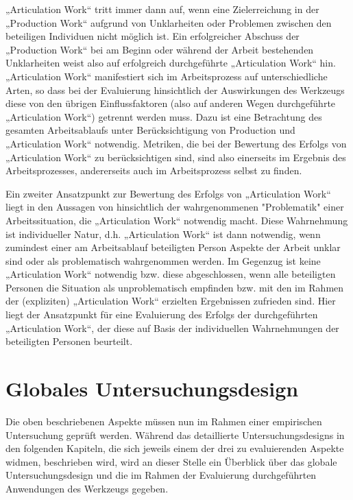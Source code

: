 „Articulation Work“ tritt immer dann auf, wenn eine Zielerreichung in der „Production Work“ aufgrund von Unklarheiten oder Problemen zwischen den beteiligen Individuen nicht möglich ist. Ein erfolgreicher Abschuss der „Production Work“ bei am Beginn oder während der Arbeit bestehenden Unklarheiten weist also auf erfolgreich durchgeführte „Articulation Work“ hin. „Articulation Work“ manifestiert sich im Arbeitsprozess auf unterschiedliche Arten, so dass bei der Evaluierung hinsichtlich der Auswirkungen des Werkzeugs diese von den übrigen Einflussfaktoren (also auf anderen Wegen durchgeführte „Articulation Work“) getrennt werden muss. Dazu ist eine Betrachtung des gesamten Arbeitsablaufs unter Berücksichtigung von Production und „Articulation Work“ notwendig. Metriken, die bei der Bewertung des Erfolgs von „Articulation Work“ zu berücksichtigen sind, sind also einerseits im Ergebnis des Arbeitsprozesses, andererseits auch im Arbeitsprozess selbst zu finden.

Ein zweiter Ansatzpunkt zur Bewertung des Erfolgs von „Articulation Work“ liegt in den Aussagen von \citet{Strauss93} hinsichtlich der wahrgenommenen "Problematik" einer Arbeitssituation, die „Articulation Work“ notwendig macht. Diese Wahrnehmung ist individueller Natur, d.h. „Articulation Work“ ist dann notwendig, wenn zumindest einer am Arbeitsablauf beteiligten Person Aspekte der Arbeit unklar sind oder als problematisch wahrgenommen werden. Im Gegenzug ist keine „Articulation Work“ notwendig bzw. diese abgeschlossen, wenn alle beteiligten Personen die Situation als unproblematisch empfinden bzw. mit den im Rahmen der (expliziten) „Articulation Work“ erzielten Ergebnissen zufrieden sind. Hier liegt der Ansatzpunkt für eine Evaluierung des Erfolgs der durchgeführten „Articulation Work“, der diese auf Basis der individuellen Wahrnehmungen der beteiligten Personen beurteilt.

\section{Globales Untersuchungsdesign}
\label{sec:globales_untersuchungsdesign}

Die oben beschriebenen Aspekte müssen nun im Rahmen einer empirischen Untersuchung geprüft werden. Während das detaillierte Untersuchungsdesigns in den folgenden Kapiteln, die sich jeweils einem der drei zu evaluierenden Aspekte widmen, beschrieben wird, wird an dieser Stelle ein Überblick über das globale Untersuchungsdesign und die im Rahmen der Evaluierung durchgeführten Anwendungen des Werkzeugs gegeben.

